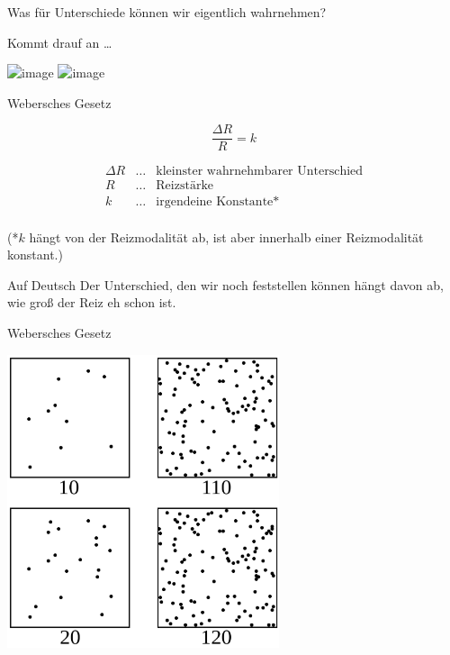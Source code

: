 \documentclass{beamer}
\begin{document}
\begin{frame}{Was für Unterschiede können wir eigentlich wahrnehmen?}

Kommt drauf an \dots

\begin{center}
    \includegraphics<1>[width=0.8\textwidth]{priscilla-du-preez-CoqJGsFVJtM-unsplash.jpg}
        \includegraphics<2>[width=0.8\textwidth]{liuba-bilyk-wU_TbWqdPJI-unsplash.jpg}

\end{center}

    
\end{frame}



\begin{frame}{Webersches Gesetz}

\[
\frac{\Delta R}{R} = k
\]

\[
\begin{array}{lll}
\Delta R    & \ldots    & \text{kleinster wahrnehmbarer Unterschied} \\
R           & \ldots    & \text{Reizstärke} \\
k           & \ldots    & \text{irgendeine Konstante*} \\
\end{array}
\]


(*\(k\) hängt von der Reizmodalität ab, ist aber innerhalb einer Reizmodalität konstant.)

 

\begin{block}{Auf Deutsch}
Der Unterschied, den wir noch feststellen können hängt davon ab, wie groß der Reiz eh schon ist. 
\end{block}



\end{frame}


\begin{frame}{Webersches Gesetz}
\begin{center}
    \includegraphics[width=0.6\textwidth]{Weber-Fechner_law_demo_-_dots.svg.png}
\end{center}
\end{frame}
\end{document}

